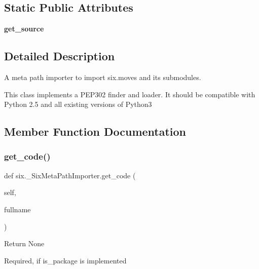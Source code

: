 \subsection*{Static Public Attributes}
\begin{DoxyCompactItemize}
\item 
\mbox{\label{classsix_1_1___six_meta_path_importer_a0b3f68544bd92fe7829e9ce96143aec6}} 
{\bfseries get\+\_\+source}
\end{DoxyCompactItemize}


\subsection{Detailed Description}
\begin{DoxyVerb}A meta path importer to import six.moves and its submodules.

This class implements a PEP302 finder and loader. It should be compatible
with Python 2.5 and all existing versions of Python3
\end{DoxyVerb}
 

\subsection{Member Function Documentation}
\mbox{\label{classsix_1_1___six_meta_path_importer_af17c478b4ec0437d4d86d040295261f9}} 
\subsubsection{\texorpdfstring{get\+\_\+code()}{get\_code()}}
{\footnotesize\ttfamily def six.\+\_\+\+Six\+Meta\+Path\+Importer.\+get\+\_\+code (\begin{DoxyParamCaption}\item[{}]{self,  }\item[{}]{fullname }\end{DoxyParamCaption})}

\begin{DoxyVerb}Return None

Required, if is_package is implemented\end{DoxyVerb}
 \mbox{\label{classsix_1_1___six_meta_path_importer_a442b9688b6f1dac8cfdc6d622b0a191d}} 
